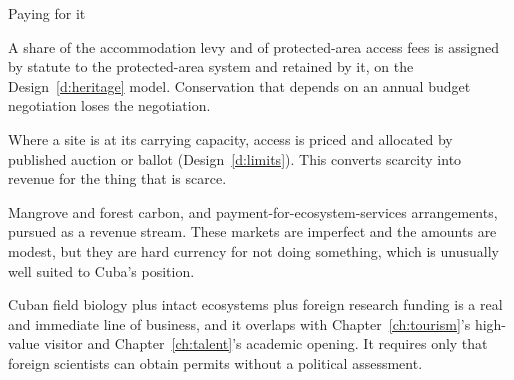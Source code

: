 \begin{design}{Paying for it}
\label{d:natfinance}
\begin{rules}
 A share of the accommodation levy and of protected-area
access fees is assigned by statute to the protected-area system and retained by
it, on the Design~\ref{d:heritage} model. Conservation that depends on an annual
budget negotiation loses the negotiation.

 Where a site is at its carrying capacity, access is
priced and allocated by published auction or ballot
(Design~\ref{d:limits}). This converts scarcity into revenue for the thing that
is scarce.

 Mangrove and forest carbon, and
payment-for-ecosystem-services arrangements, pursued as a revenue stream. These
markets are imperfect and the amounts are modest, but they are hard currency for
not doing something, which is unusually well suited to Cuba's position.

 Cuban field biology plus intact ecosystems plus
foreign research funding is a real and immediate line of business, and it
overlaps with Chapter~\ref{ch:tourism}'s high-value visitor and
Chapter~\ref{ch:talent}'s academic opening. It requires only that foreign
scientists can obtain permits without a political assessment.
\end{rules}
\end{design}

